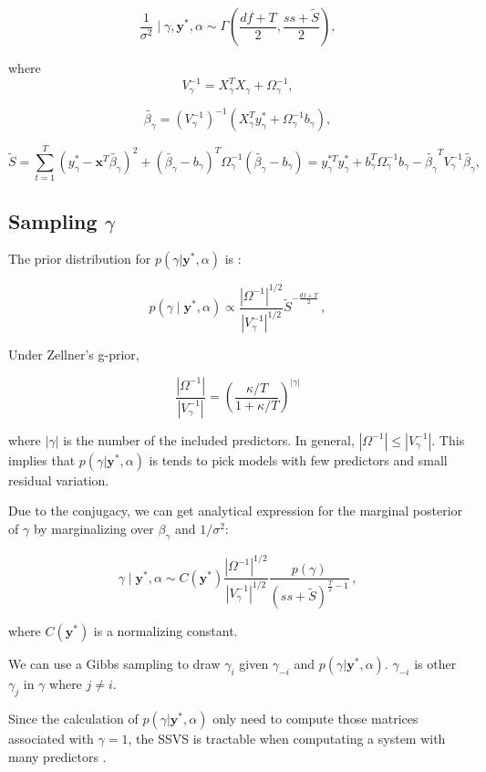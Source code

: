  
 $$\frac {1}{\sigma^{2}} \mid \gamma, \mathbf{y}^*, \alpha \sim  \Gamma(\frac{df+T}{2}, \frac{ss + \tilde{S}}{2}),$$  
 
where $$V_{\gamma}^{-1} = X_{\gamma}^T X_{\gamma} + \Omega_{\gamma}^{-1},$$ 
 
 $$ \tilde{\beta_{\gamma}} =  (V_{\gamma}^{-1})^{-1} (X_{\gamma}^T y_{\gamma}^* + \Omega_{\gamma}^{-1} b_{\gamma}),$$
 
 $$\tilde{S} = \sum_{t=1}^{T} (y_{\gamma}^* - \mathbf{x}^T \tilde{\beta_{\gamma}})^2 +   (\tilde{\beta_{\gamma}}- b_{\gamma})^T \Omega_{\gamma}^{-1} (\tilde{\beta_{\gamma}}- b_{\gamma}) = y_{\gamma}^{*T} y_{\gamma}^* + b_{\gamma}^T \Omega_{\gamma}^{-1} b_{\gamma} - \tilde{\beta_{\gamma}}^T V_{\gamma}^{-1} \tilde{\beta_{\gamma}},$$ 
 
\subsection{Sampling $\gamma$} 
 
The prior distribution for $p(\gamma |  \mathbf{y}^*, \alpha)$ is :



$$p(\gamma \mid \mathbf{y}^*, \alpha) \propto \frac{|\Omega^{-1}|^{1/2}}{|V_{\gamma}^{-1}|^{1/2}} \tilde S^{-\frac{df+T}{2}}  \, ,$$

Under Zellner's g-prior, 


 $$\frac{|\Omega^{-1}|}{|V_{\gamma}^{-1}|} = \left(\frac{\kappa/T}{1+ \kappa/T}\right)^{|\gamma|}$$
 
where $|\gamma|$ is the number of the included predictors. In general,  $|\Omega^{-1}| \le |V_{\gamma}^{-1}|$. This implies that $p(\gamma |  \mathbf{y}^*, \alpha)$ is tends to pick models with few predictors and small residual variation. 



Due to the conjugacy, we can get analytical expression for the marginal posterior of $\gamma$ by marginalizing over  $\beta_{\gamma}$ and ${1}/{\sigma^{2}}$:



$$\gamma \mid \mathbf{y}^*, \alpha \sim C(\mathbf{y}^*) \frac{|\Omega^{-1}|^{1/2}}{|V_{\gamma}^{-1}|^{1/2}} \frac{p(\gamma)}{(ss + \tilde{S})^{\frac{T}{2} -1}} \, ,$$

where $C(\mathbf{y}^*)$ is a normalizing constant. 

We can use a Gibbs sampling to draw $\gamma_i$ given $\gamma_{-i}$ and $p(\gamma |  \mathbf{y}^*, \alpha)$. $\gamma_{-i}$ is other $\gamma_{j}$ in $\gamma$ where $j \neq i$.



Since the calculation of $p(\gamma |  \mathbf{y}^*, \alpha)$ only need to compute those matrices associated with $\gamma = 1$,  the SSVS is tractable when computating a system with many predictors \cite{Scott2014b}.
 